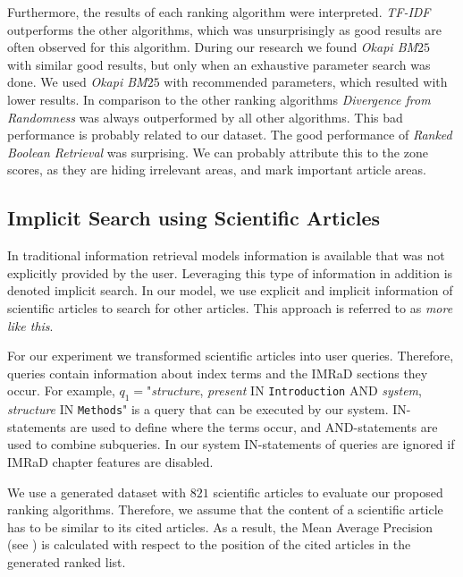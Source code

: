 Furthermore, the results of each ranking algorithm were interpreted. \textit{TF-IDF} outperforms the other algorithms, which was unsurprisingly as good results are often observed for this algorithm. During our research we found \textit{Okapi BM$25$} with similar good results, but only when an exhaustive parameter search was done. We used \textit{Okapi BM$25$} with recommended parameters, which resulted with lower results. In comparison to the other ranking algorithms \textit{Divergence from Randomness} was always outperformed by all other algorithms. This bad performance is probably related to our dataset. The good performance of \textit{Ranked Boolean Retrieval} was surprising. We can probably attribute this to the zone scores, as they are hiding irrelevant areas, and mark important article areas.


\subsection{Implicit Search using Scientific Articles}
\label{sec:implicit_search_results}

In traditional information retrieval models information is available that was not explicitly provided by the user. Leveraging this type of information in addition is denoted implicit search. In our model, we use explicit and implicit information of scientific articles to search for other articles. This approach is referred to as \textit{more like this}.

For our experiment we transformed scientific articles into user queries. Therefore, queries contain information about index terms and the IMRaD sections they occur. For example, $q_1=$"\textit{structure}, \textit{present} IN \texttt{Introduction} AND \textit{system}, \textit{structure} IN \texttt{Methods}" is a query that can be executed by our system. IN-statements are used to define where the terms occur, and AND-statements are used to combine subqueries. In our system IN-statements of queries are ignored if IMRaD chapter features are disabled.

We use a generated dataset with $821$ scientific articles to evaluate our proposed ranking algorithms. Therefore, we assume that the content of a scientific article has to be similar to its cited articles. As a result, the Mean Average Precision (see ) is calculated with respect to the position of the cited articles in the generated ranked list.

